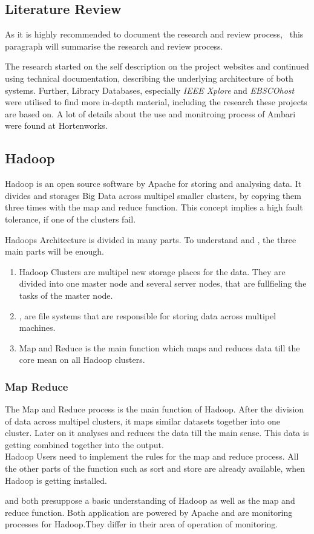 \subsection{Literature Review}
As it is highly recommended to document the research and review process,~\cite{brocke09} this paragraph will summarise the research and review process.

The research started on the self description on the project websites and continued using technical documentation, describing the underlying architecture of both systems.
Further, Library Databases, especially \emph{IEEE Xplore} and \emph{EBSCOhost} were utilised to find more in-depth material, including the research these projects are based on. A lot of details about the use and monitroing process of Ambari were found at Hortenworks.
	
\subsection{Hadoop}
\label{subsec:Hadoop}
Hadoop is an open source software by Apache for storing and analysing data. It divides and storages Big Data across multipel smaller clusters, by copying them three times with the map and reduce function. This concept implies a high fault tolerance, if one of the clusters fail.

Hadoops Architecture is divided in many parts. To understand \amb and \chuk, the three main parts will be enough.
  \\
  \begin{enumerate}
  	\item Hadoop Clusters are multipel new storage places for the data. They are divided into one master node and several server nodes, that are fullfieling the tasks of the master node.
  	\item \hdfs, are file systems that are responsible for storing data across multipel machines.
  	\item Map and Reduce is the main function which maps and reduces data till the core mean on all Hadoop clusters.
  \end{enumerate}

\subsubsection*{Map Reduce}
The Map and Reduce process is the main function of Hadoop. After the division of data across multipel clusters, it maps similar datasets together into one cluster. 
Later on it analyses and reduces the data till the main sense. This data is getting combined together into the output. 
\\
Hadoop Users need to implement the rules for the map and reduce process. All the other parts of the function such as sort and store are already available, when Hadoop is getting installed.


\amb and \chuk both presuppose a basic understanding of Hadoop as well as the map and reduce function. Both application are powered by Apache and are monitoring processes for Hadoop.They differ in their area of operation of monitoring. 